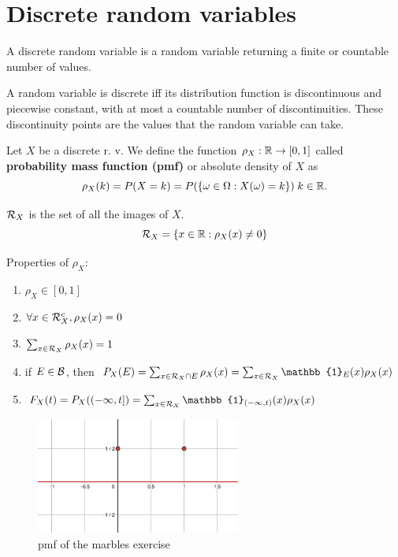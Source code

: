 \section{Discrete random variables}
\begin{definition}
    A discrete random variable is a random variable returning a finite or countable number of values.
\end{definition}
\begin{remark}
    A random variable is discrete iff its distribution function is discontinuous and piecewise constant, with at most a countable number of discontinuities. These discontinuity points are the values that the random variable can take.
\end{remark}
\begin{definition}
    Let $X$ be a discrete r. v. We define the function $\rho_X:\mathbb{R}\to[0,1]$ called \textbf{probability mass function (pmf)} or absolute density of $X$ as
    \begin{equation*}
        \rho_X(k)=P(X=k)=P(\{\omega \in \Omega:X(\omega)=k\}) \; k\in\mathbb{R}.
    \end{equation*}
\end{definition}
\begin{definition}
    $\mathcal{R}_X$ is the set of all the images of $X$.
    \begin{equation*}
        \mathcal{R}_X=\{x \in \mathbb{R}: \rho_X(x)\ne 0\}
    \end{equation*}
\end{definition}
Properties of $\rho_X$:
\begin{enumerate}
    \item $\rho_X \in [0, 1]$
    \item $\forall x \in \mathcal{R}_X^c, \rho_X(x)=0$
    \item $\sum_{x \in \mathcal{R}_X}\rho_X(x)=1 $
    \item if $E \in \mathcal{B}$, then $P_X(E)=\sum_{x \in \calR_X\cap E}\rho_X(x)=\sum_{x \in \calR_X}\mathbb{1}_E(x)\rho_X(x)$
    \item $F_X(t)=P_X((-\infty,t])=\sum_{x \in \calR_X}\mathbb{1}_{(-\infty, t)}(x)\rho_X(x)$
\end{enumerate}
\begin{figure}[ht]
    \centering
    \includegraphics[width=0.6\textwidth]{images/pmf.png}
    \caption*{pmf of the marbles exercise}
\end{figure}
